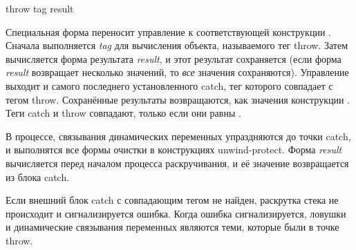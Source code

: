 \begin{defspec}
throw tag result

Специальная форма  переносит управление к соответствующей конструкции
.
Сначала выполняется \emph{tag} для вычисления объекта, называемого тег
throw. Затем вычисляется форма результата \emph{result}, и этот результат
сохраняется (если форма \emph{result} возвращает несколько значений, то
\emph{все} значения сохраняются).
Управление выходит и самого последнего установленного catch, тег которого
совпадает с тегом throw. Сохранённые результаты возвращаются, как значения
конструкции .
Теги catch и throw совпадают, только если они равны .

В процессе, связывания динамических переменных упраздняются до точки catch, и
выполнятся все формы очистки в конструкциях unwind-protect.
Форма \emph{result} вычисляется перед началом процесса раскручивания, и её
значение возвращается из блока catch.

Если внешний блок catch с совпадающим тегом не найден, раскрутка стека не
происходит и сигнализируется ошибка.
Когда ошибка сигнализируется, ловушки и динамические связывания переменных
являются теми, которые были в точке throw.
\end{defspec}
\fi